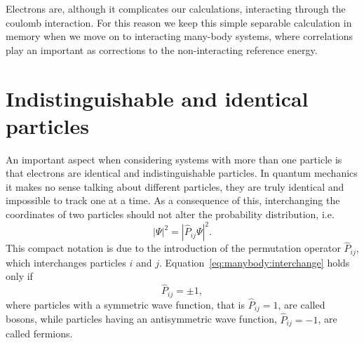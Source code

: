 Electrons are, although it complicates our calculations, interacting through the coulomb interaction. 
For this reason we keep this simple separable calculation in memory when we move on to interacting 
many-body systems, where correlations play an important  as corrections to the non-interacting reference energy.


\section{Indistinguishable and identical particles}
An important aspect when considering systems with more than one particle is that electrons are identical and indistinguishable particles.
In quantum mechanics it makes no sense talking about different particles, they are truly identical and impossible to track one at a time.
As a consequence of this, interchanging the coordinates of two particles should not alter the probability distribution, i.e.
\begin{equation}
\label{eq:manybody:interchange}
| \Psi |^2
=
|\hat{P}_{ij} \Psi |^2 .
\end{equation}
This compact notation is due to the introduction of the permutation operator $\hat{P}_{ij}$, which interchanges particles $i$ and $j$. Equation~\eqref{eq:manybody:interchange} holds only if
\begin{equation}
\hat{P}_{ij} = \pm 1 ,
\end{equation}
where particles with a symmetric wave function, that is $\hat{P}_{ij} = 1$, are called bosons, while particles having an antisymmetric wave function, $\hat{P}_{ij} = -1$, are called fermions.

